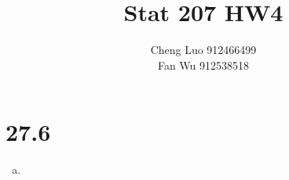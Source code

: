 \documentclass{article}\usepackage[]{graphicx}\usepackage[]{color}
\begin{document}
\title{\huge \textbf{Stat 207 HW4} \\}
\author{\large Cheng Luo 912466499 \\ \large Fan Wu 912538518}
\maketitle

\newpage
\mbox{}
\newpage

\section{27.6}

\begin{enumerate}[(a)]

\item


\end{enumerate}
\end{document}

